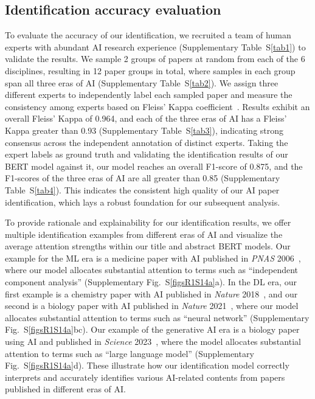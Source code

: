 \subsection{Identification accuracy evaluation}
\label{Identification accuracy evaluation}
To evaluate the accuracy of our identification, we recruited a team of human experts with abundant AI research experience (Supplementary Table~S\ref{tab1}) to validate the results.
We sample 2 groups of papers at random from each of the 6 disciplines, resulting in 12 paper groups in total, where samples in each group span all three eras of AI (Supplementary Table~S\ref{tab2}).
We assign three different experts to independently label each sampled paper and measure the consistency among experts based on Fleiss’ Kappa coefficient~\supercite{landis1977measurement}.
Results exhibit an overall Fleiss’ Kappa of 0.964, and each of the three eras of AI has a Fleiss’ Kappa greater than 0.93 (Supplementary Table~S\ref{tab3}), indicating strong consensus across the independent annotation of distinct experts.
Taking the expert labels as ground truth and validating the identification results of our BERT model against it, our model reaches an overall F1-score of 0.875, and the F1-scores of the three eras of AI are all greater than 0.85 (Supplementary Table~S\ref{tab4}).
This indicates the consistent high quality of our AI paper identification, which lays a robust foundation for our subsequent analysis.

To provide rationale and explainability for our identification results, we offer multiple identification examples from different eras of AI and visualize the average attention strengths within our title and abstract BERT models.
Our example for the ML era is a medicine paper with AI published in \textit{PNAS} 2006~\supercite{damoiseaux2006consistent}, where our model allocates substantial attention to terms such as “independent component analysis” (Supplementary Fig.~S\ref{figsR1S14a}a).
In the DL era, our first example is a chemistry paper with AI published in \textit{Nature} 2018~\supercite{segler2018planning}, and our second is a biology paper with AI published in \textit{Nature} 2021~\supercite{jumper2021highly}, where our model allocates substantial attention to terms such as “neural network” (Supplementary Fig.~S\ref{figsR1S14a}bc).
Our example of the generative AI era is a biology paper using AI and published in \textit{Science} 2023~\supercite{lin2023evolutionary}, where the model allocates substantial attention to terms such as “large language model” (Supplementary Fig.~S\ref{figsR1S14a}d).
These illustrate how our identification model correctly interprets and accurately identifies various AI-related contents from papers published in different eras of AI.

